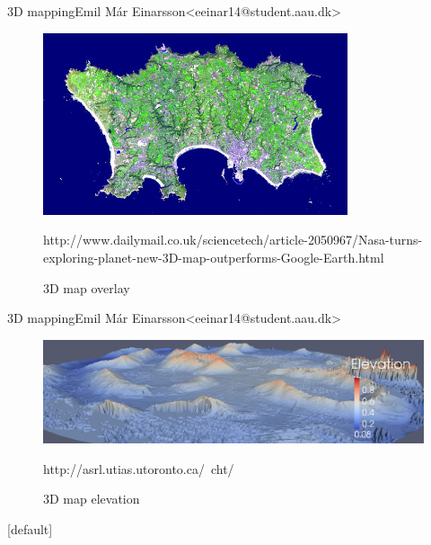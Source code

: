 \begin{frame}{3D mapping}{Emil Már Einarsson\newline<eeinar14@student.aau.dk>}
	\begin{figure}[h!]
    	\includegraphics[width=0.8\textwidth]{images/3dmap2.jpg}
    	\caption{3D map overlay}
    	\tiny{http://www.dailymail.co.uk/sciencetech/article-2050967/Nasa-turns-exploring-planet-new-3D-map-outperforms-Google-Earth.html}
		\centering    		
	\end{figure}
\end{frame}

\begin{frame}{3D mapping}{Emil Már Einarsson\newline<eeinar14@student.aau.dk>}
	\begin{figure}[h!]
    	\includegraphics[width=1\textwidth]{images/3dmap1.jpg}
    	\caption{3D map elevation}
    	\tiny{http://asrl.utias.utoronto.ca/~cht/}
		\centering    		
	\end{figure}
\end{frame}






[default]